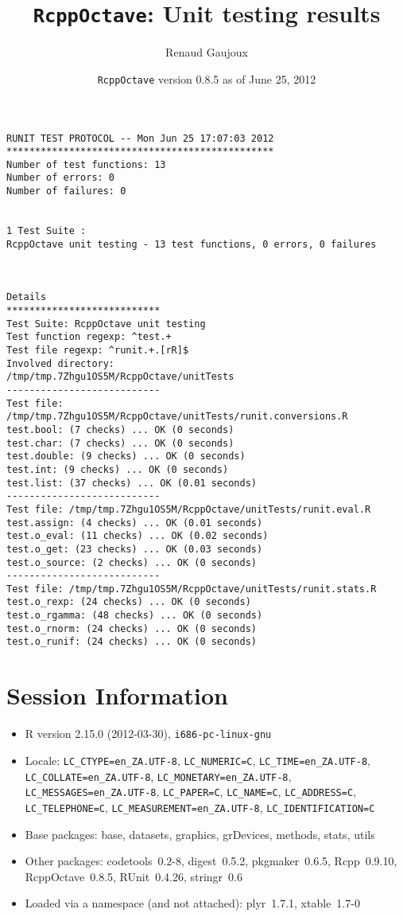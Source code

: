 \documentclass[10pt]{article}
\author{Renaud Gaujoux}
\title{\texttt{RcppOctave}: Unit testing results}
\date{\texttt{RcppOctave} version 0.8.5 as of June 25, 2012}
\begin{document}
\maketitle

\begin{verbatim}
RUNIT TEST PROTOCOL -- Mon Jun 25 17:07:03 2012 
*********************************************** 
Number of test functions: 13 
Number of errors: 0 
Number of failures: 0 

 
1 Test Suite : 
RcppOctave unit testing - 13 test functions, 0 errors, 0 failures



Details 
*************************** 
Test Suite: RcppOctave unit testing 
Test function regexp: ^test.+ 
Test file regexp: ^runit.+.[rR]$ 
Involved directory: 
/tmp/tmp.7Zhgu1OS5M/RcppOctave/unitTests 
--------------------------- 
Test file: /tmp/tmp.7Zhgu1OS5M/RcppOctave/unitTests/runit.conversions.R 
test.bool: (7 checks) ... OK (0 seconds)
test.char: (7 checks) ... OK (0 seconds)
test.double: (9 checks) ... OK (0 seconds)
test.int: (9 checks) ... OK (0 seconds)
test.list: (37 checks) ... OK (0.01 seconds)
--------------------------- 
Test file: /tmp/tmp.7Zhgu1OS5M/RcppOctave/unitTests/runit.eval.R 
test.assign: (4 checks) ... OK (0.01 seconds)
test.o_eval: (11 checks) ... OK (0.02 seconds)
test.o_get: (23 checks) ... OK (0.03 seconds)
test.o_source: (2 checks) ... OK (0 seconds)
--------------------------- 
Test file: /tmp/tmp.7Zhgu1OS5M/RcppOctave/unitTests/runit.stats.R 
test.o_rexp: (24 checks) ... OK (0 seconds)
test.o_rgamma: (48 checks) ... OK (0 seconds)
test.o_rnorm: (24 checks) ... OK (0 seconds)
test.o_runif: (24 checks) ... OK (0 seconds)
\end{verbatim}

\section*{Session Information}
\begin{itemize}\raggedright
  \item R version 2.15.0 (2012-03-30), \verb|i686-pc-linux-gnu|
  \item Locale: \verb|LC_CTYPE=en_ZA.UTF-8|, \verb|LC_NUMERIC=C|, \verb|LC_TIME=en_ZA.UTF-8|, \verb|LC_COLLATE=en_ZA.UTF-8|, \verb|LC_MONETARY=en_ZA.UTF-8|, \verb|LC_MESSAGES=en_ZA.UTF-8|, \verb|LC_PAPER=C|, \verb|LC_NAME=C|, \verb|LC_ADDRESS=C|, \verb|LC_TELEPHONE=C|, \verb|LC_MEASUREMENT=en_ZA.UTF-8|, \verb|LC_IDENTIFICATION=C|
  \item Base packages: base, datasets, graphics, grDevices, methods,
    stats, utils
  \item Other packages: codetools~0.2-8, digest~0.5.2, pkgmaker~0.6.5,
    Rcpp~0.9.10, RcppOctave~0.8.5, RUnit~0.4.26, stringr~0.6
  \item Loaded via a namespace (and not attached): plyr~1.7.1,
    xtable~1.7-0
\end{itemize}
\end{document}
